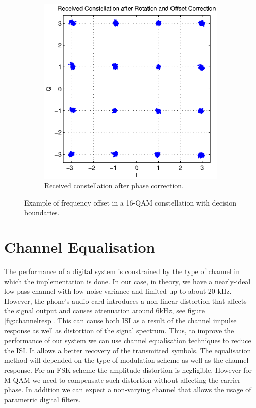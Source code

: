 \documentclass[12pt,a4paper,openright]{report}
\begin{document}
\begin{figure}[H]
    \begin{subfigure}{0.32\textwidth}
 \centering
    \includegraphics[width=0.9\linewidth]{rx_const_after.eps}
    \caption{Received constellation after phase correction.}
    \label{fig:PD3}
    \end{subfigure}
    \caption[Example of frequency offset in a 16-QAM constellation]{Example of frequency offset in a 16-QAM constellation with decision boundaries.  }
    \label{fig:phaseoff}
\end{figure}




\section{Channel Equalisation}
\label{sec:chanEQ}
The performance of a digital system is constrained by the type of channel in which the implementation is done. In our case, in theory, we have a nearly-ideal low-pass channel with low noise variance and limited up to about 20 kHz. However, the phone's audio card introduces a non-linear distortion that affects the signal output and causes attenuation around 6kHz, see figure \ref{fig:channelresp}. This can cause both ISI as a result of the channel impulse response as well as distortion of the signal spectrum. Thus, to improve the performance of our system we can use channel equalisation techniques to reduce the ISI. It allows a better recovery of the transmitted symbols. The equalisation method will depended on the type of modulation scheme as well as the channel response. For an FSK scheme the amplitude distortion is negligible. However for M-QAM we need to compensate such distortion without affecting the carrier phase. In addition we can expect a non-varying channel that allows the usage of parametric digital filters.  
\end{document}
